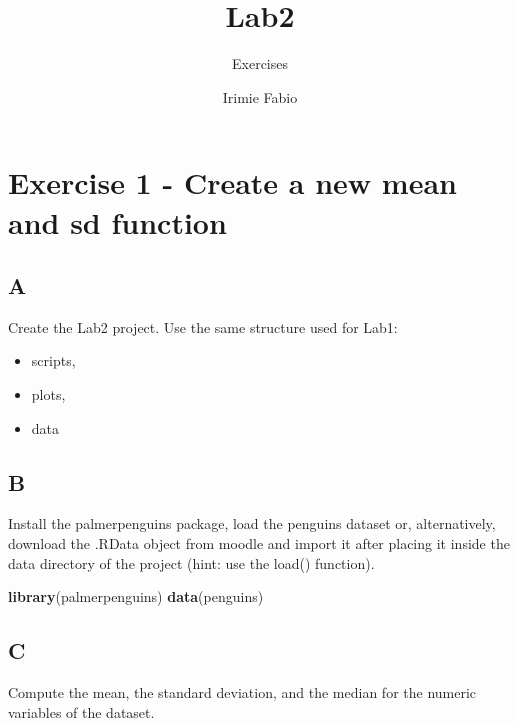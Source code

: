 \documentclass[
]{article}
\title{Lab2}
\subtitle{Exercises}
\author{Irimie Fabio}
\date{}
\newenvironment{Shaded}{\begin{snugshade}}{\end{snugshade}}
\newcommand{\KeywordTok}[1]{\textcolor[rgb]{0.13,0.29,0.53}{\textbf{#1}}}
\newcommand{\NormalTok}[1]{#1}
\providecommand{\tightlist}{%
  \setlength{\itemsep}{0pt}\setlength{\parskip}{0pt}}
\begin{document}
\maketitle

{
\setcounter{tocdepth}{2}
\tableofcontents
}
\hypertarget{exercise-1---create-a-new-mean-and-sd-function}{%
\section{Exercise 1 - Create a new mean and sd
function}\label{exercise-1---create-a-new-mean-and-sd-function}}

\hypertarget{a}{%
\subsection{A}\label{a}}

Create the Lab2 project. Use the same structure used for Lab1:

\begin{itemize}
\tightlist
\item
  scripts,
\item
  plots,
\item
  data
\end{itemize}

\hypertarget{b}{%
\subsection{B}\label{b}}

Install the palmerpenguins package, load the penguins dataset or,
alternatively, download the .RData object from moodle and import it
after placing it inside the data directory of the project (hint: use the
load() function).

\begin{Shaded}
\begin{Highlighting}[]
\KeywordTok{library}\NormalTok{(palmerpenguins)}
\KeywordTok{data}\NormalTok{(penguins)}
\end{Highlighting}
\end{Shaded}

\hypertarget{c}{%
\subsection{C}\label{c}}

Compute the mean, the standard deviation, and the median for the numeric
variables of the dataset.
\end{document}
